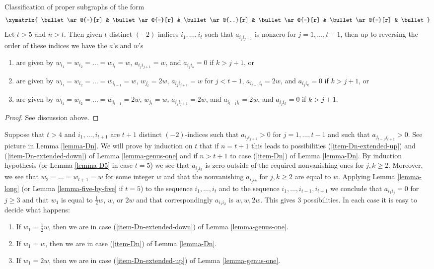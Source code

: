 \begin{lemma}
\label{lemma-long}
Classification of proper subgraphs of the form
$$
\xymatrix{
\bullet \ar@{-}[r] &
\bullet \ar@{-}[r] &
\bullet \ar@{..}[r] &
\bullet \ar@{-}[r] &
\bullet \ar@{-}[r] &
\bullet
}
$$
Let $t > 5$ and $n > t$. Then given $t$ distinct $(-2)$-indices
$i_1, \ldots, i_t$ such that $a_{i_ji_{j + 1}}$ is nonzero for
$j = 1, \ldots, t - 1$, then up to reversing the order of these indices
we have the $a$'s and $w$'s
\begin{enumerate}
\item
\label{item-An}
are given by $w_{i_1} = w_{i_2} = \ldots = w_{i_t} = w$,
$a_{i_ji_{j + 1}} = w$, and $a_{i_ji_k} = 0$ if $k > j + 1$, or
\item
\label{item-Cn}
are given by $w_{i_1} = w_{i_2} = \ldots = w_{i_{t - 1}} = w$,
$w_{j_t} = 2w$, $a_{i_ji_{j + 1}} = w$ for $j < t - 1$,
$a_{i_{t - 1}i_t} = 2w$, and $a_{i_ji_k} = 0$ if $k > j + 1$, or
\item
\label{item-Bn}
are given by $w_{i_1} = w_{i_2} = \ldots = w_{i_{t - 1}} = 2w$,
$w_{j_t} = w$, $a_{i_ji_{j + 1}} = 2w$, and
$a_{i_{t - 1}i_t} = 2w$, and $a_{i_ji_k} = 0$ if $k > j + 1$.
\end{enumerate}
\end{lemma}

\begin{proof}
See discussion above.
\end{proof}

\noindent
Suppose that $t > 4$ and $i_1, \ldots, i_{t + 1}$ are $t + 1$
distinct $(-2)$-indices such that $a_{i_ji_{j + 1}} > 0$
for $j = 1, \ldots, t - 1$ and such that $a_{j_{t - 1}j_{t + 1}} > 0$.
See picture in Lemma \ref{lemma-Dn}. We will prove by induction on $t$
that if $n = t + 1$ this leads to possibilities
(\ref{item-Dn-extended-up}) and (\ref{item-Dn-extended-down})
of Lemma \ref{lemma-genus-one} and if $n > t + 1$ to
case (\ref{item-Dn}) of Lemma \ref{lemma-Dn}.
By induction hypothesis (or Lemma \ref{lemma-D5} in case $t = 5$)
we see that $a_{i_ji_k}$ is zero outside of the required
nonvanishing ones for $j, k \geq 2$.
Moreover, we see that $w_2 = \ldots = w_{t + 1} = w$ for some integer
$w$ and that the nonvanishing $a_{i_ji_k}$ for $j, k \geq 2$ are
equal to $w$. Applying Lemma \ref{lemma-long}
(or Lemma \ref{lemma-five-by-five} if $t = 5$) to the sequence
$i_1, \ldots, i_t$ and to the sequence
$i_1, \ldots, i_{t - 1}, i_{t + 1}$ we conclude that
$a_{i_1 i_j} = 0$ for $j \geq 3$ and that
$w_1$ is equal to $\frac{1}{2}w$, $w$, or $2w$
and that correspondingly $a_{i_1i_2}$ is $w, w, 2w$.
This gives $3$ possibilities. In each case it is easy to
decide what happens:
\begin{enumerate}
\item If $w_1 = \frac{1}{2}w$, then we are in case
(\ref{item-Dn-extended-down}) of Lemma \ref{lemma-genus-one}.
\item If $w_1 = w$, then we are in case
(\ref{item-Dn}) of Lemma \ref{lemma-Dn}.
\item If $w_1 = 2w$, then we are in case
(\ref{item-Dn-extended-up}) of Lemma \ref{lemma-genus-one}.
\end{enumerate}

